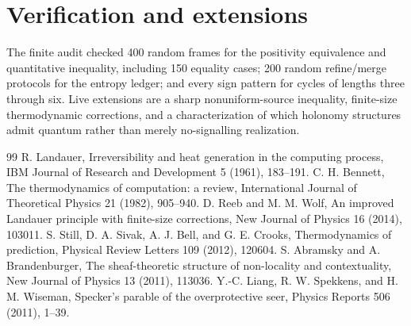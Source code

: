 \documentclass[11pt,a4paper]{article}
\begin{document}
\section{Verification and extensions}
The finite audit checked 400 random frames for the positivity equivalence and quantitative inequality, including 150 equality cases; 200 random refine/merge protocols for the entropy ledger; and every sign pattern for cycles of lengths three through six. Live extensions are a sharp nonuniform-source inequality, finite-size thermodynamic corrections, and a characterization of which holonomy structures admit quantum rather than merely no-signalling realization.

\begin{thebibliography}{99}
 R. Landauer, Irreversibility and heat generation in the computing process, IBM Journal of Research and Development 5 (1961), 183--191.
 C. H. Bennett, The thermodynamics of computation: a review, International Journal of Theoretical Physics 21 (1982), 905--940.
 D. Reeb and M. M. Wolf, An improved Landauer principle with finite-size corrections, New Journal of Physics 16 (2014), 103011.
 S. Still, D. A. Sivak, A. J. Bell, and G. E. Crooks, Thermodynamics of prediction, Physical Review Letters 109 (2012), 120604.
 S. Abramsky and A. Brandenburger, The sheaf-theoretic structure of non-locality and contextuality, New Journal of Physics 13 (2011), 113036.
 Y.-C. Liang, R. W. Spekkens, and H. M. Wiseman, Specker's parable of the overprotective seer, Physics Reports 506 (2011), 1--39.
\end{thebibliography}
\end{document}

